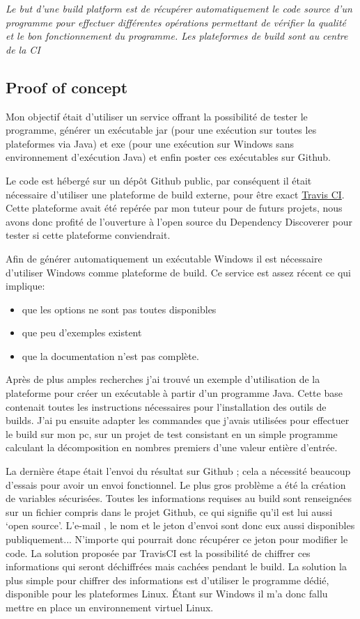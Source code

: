 \documentclass[french,a4paper,12pt]{report}
\begin{document}
\textit{Le but d’une build platform est de récupérer automatiquement le code source d’un programme pour effectuer différentes opérations permettant de vérifier la qualité et le bon fonctionnement du programme. Les plateformes de build sont au centre de la CI}

\subsection{Proof of concept}

Mon objectif était d'utiliser un service offrant la possibilité de tester le programme, générer un exécutable jar (pour une exécution sur toutes les plateformes via Java) et exe (pour une exécution sur Windows sans environnement d’exécution Java) et enfin poster ces exécutables sur Github. 

Le code est hébergé sur un dépôt Github public, par conséquent il était nécessaire d’utiliser une plateforme de build externe, pour être exact \href{https://travis-ci.com/}{Travis CI}. Cette plateforme avait été repérée par mon tuteur pour de futurs projets, nous avons donc profité de l'ouverture à l'open source du Dependency Discoverer pour tester si cette plateforme conviendrait.

Afin de générer automatiquement un exécutable Windows il est nécessaire d’utiliser Windows comme plateforme de build. Ce service est assez récent ce qui implique:

\begin{itemize}

 \item que les options ne sont pas toutes disponibles
 \item que peu d’exemples existent
 \item que la documentation n’est pas complète.

\end{itemize}

Après de plus amples recherches j’ai trouvé un exemple d’utilisation de la plateforme pour créer un exécutable à partir d’un programme Java. Cette base contenait toutes les instructions nécessaires pour l’installation des outils de builds. J’ai pu ensuite adapter les commandes que j’avais utilisées pour effectuer le build sur mon pc, sur un projet de test consistant en un simple programme calculant la décomposition en nombres premiers d'une valeur entière d'entrée.

La dernière étape était l’envoi du résultat sur Github ; cela a nécessité beaucoup d'essais pour avoir un envoi fonctionnel. Le plus gros problème a été la création de variables sécurisées. Toutes les informations requises au build sont renseignées sur un fichier compris dans le projet Github, ce qui signifie qu’il est lui aussi ‘open source’. L’e-mail , le nom et le jeton d’envoi sont donc eux aussi disponibles publiquement... N’importe qui pourrait donc récupérer ce jeton pour modifier le code. La solution proposée par TravisCI est la possibilité de chiffrer ces informations qui seront déchiffrées mais cachées pendant le build. La solution la plus simple pour chiffrer des informations est d’utiliser le programme dédié, disponible pour les plateformes Linux. Étant sur Windows il m’a donc fallu mettre en place un environnement virtuel Linux.
\end{document}
